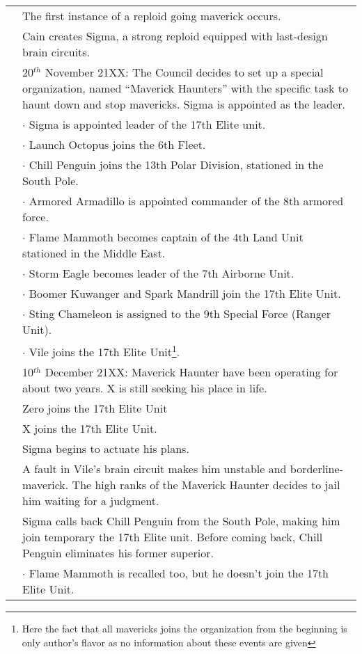 \begin{tabularx}{\linewidth}{l X}
	\tabdot& The first instance of a reploid going maverick occurs.\\
	\tabdot& Cain creates Sigma, a strong reploid equipped with last-design brain circuits.\\
	\tabdot& 20$^{th}$ November 21XX: The Council decides to set up a special organization, named ``Maverick Haunters'' with the specific task to haunt down and stop mavericks. Sigma is appointed as the leader.\\
	\tabline& $\cdot$ Sigma is appointed leader of the 17th Elite unit.\\
	\tabline& $\cdot$ Launch Octopus joins the 6th Fleet.\\
	\tabline& $\cdot$ Chill Penguin joins the 13th Polar Division, stationed in the South Pole.\\
	\tabline& $\cdot$ Armored Armadillo is appointed commander of the 8th armored force.\\
	\tabline& $\cdot$ Flame Mammoth becomes captain of the 4th Land Unit stationed in the Middle East.\\
	\tabline& $\cdot$ Storm Eagle becomes leader of the 7th Airborne Unit.\\
	\tabline& $\cdot$ Boomer Kuwanger and Spark Mandrill join the 17th Elite Unit.\\
	\tabline& $\cdot$ Sting Chameleon is assigned to the 9th Special Force (Ranger Unit).\\
	\tabline& $\cdot$ Vile joins the 17th Elite Unit\footnote{Here the fact that all mavericks joins the organization from the beginning is only author's flavor as no information about these events are given}.\\
	\tabdot& 10$^{th}$ December 21XX: Maverick Haunter have been operating for about two years. X is still seeking his place in life.\\
	\tabdot& Zero joins the 17th Elite Unit\\
	\tabdot& X joins the 17th Elite Unit.\\
	\tabdot& Sigma begins to actuate his plans.\\
	\tabdot& A fault in Vile's brain circuit makes him unstable and borderline-maverick. The high ranks of the Maverick Haunter decides to jail him waiting for a judgment.\\
	\tabdot& Sigma calls back Chill Penguin from the South Pole, making him join temporary the 17th Elite unit. Before coming back, Chill Penguin eliminates his former superior.\\
	\tabline& $\cdot$ Flame Mammoth is recalled too, but he doesn't join the 17th Elite Unit.\\

\end{tabularx}
